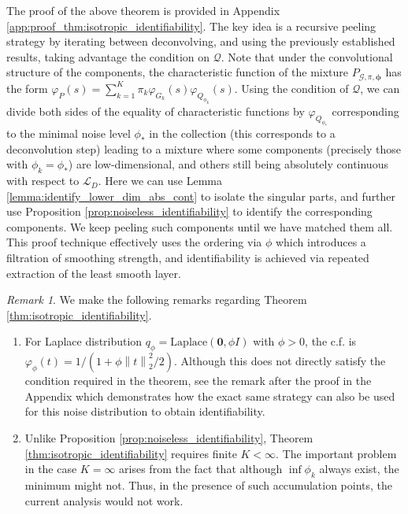 \documentclass[bj,authoryear]{imsart}
\theoremstyle{plain}
\theoremstyle{remark}
\newtheorem{remark}{Remark}
\def\bphi{{\boldsymbol\phi}}
\def\cG{\mathcal{G}}
\def\cL{\mathcal{L}}
\def\cQ{\mathcal{Q}}
\def\norm#1{\left\|#1\right\|}
\begin{document}
The proof of the above theorem  is provided in Appendix \ref{app:proof_thm:isotropic_identifiability}. The key idea is a recursive peeling strategy by iterating between deconvolving, and using the previously established results, taking advantage the condition on $\cQ$. Note that under the convolutional structure of the components, the characteristic function of the mixture $P_{\cG,\pi,\bphi}$ has the form $\varphi_P(s) = \sum_{k=1}^K \pi_k \varphi_{G_k}(s)\varphi_{Q_{\phi_k}}(s).$
Using the condition of $\cQ$, we can divide both sides of the equality of characteristic functions by $\varphi_{Q_{\phi_*}}$ corresponding to the minimal noise level $\phi_*$ in the collection (this corresponds to a deconvolution step) leading to a mixture where some components (precisely those with $\phi_k=\phi_*$) are low-dimensional, and others still being absolutely continuous with respect to $\cL_D$. Here we can use Lemma \ref{lemma:identify_lower_dim_abs_cont} to isolate the singular parts, and further use Proposition \ref{prop:noiseless_identifiability} to identify the corresponding components. We keep peeling such components until we have matched them all. This proof technique effectively uses the ordering via $\phi$ which introduces a filtration of smoothing strength, and identifiability is achieved via repeated extraction of the least smooth layer.

\begin{remark}
    We make the following remarks regarding Theorem \ref{thm:isotropic_identifiability}. 
    \begin{enumerate}
        \item For Laplace distribution $q_{\phi}=\text{Laplace}(\boldsymbol{0}, \phi I)$ with $\phi>0$, the c.f. is $\varphi_{\phi}(t)=1/(1+\phi\norm{t}_2^2/2)$. Although this does not directly satisfy the condition required in the theorem, see the remark after the proof in the Appendix which demonstrates how the exact same strategy can also be used for this noise distribution to obtain identifiability.
        \item Unlike Proposition \ref{prop:noiseless_identifiability}, Theorem \ref{thm:isotropic_identifiability} requires finite $K<\infty$. The important problem in the case $K=\infty$ arises from the fact that although $\inf \phi_k$ always exist, the minimum might not. Thus, in the presence of such accumulation points, the current analysis would not work.
    \end{enumerate}
\end{remark}
\end{document}
